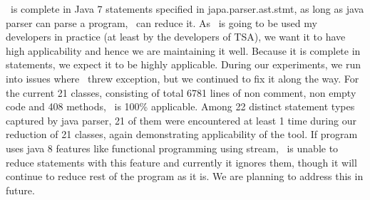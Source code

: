 \mytool\ is complete in Java 7 statements specified in japa.parser.ast.stmt, as long as java parser can parse a program, \mytool\ can reduce it. As \mytool\ is going to be used my developers in practice (at least by the developers of TSA), we want it to have high applicability and hence we are maintaining it well. Because it is complete in statements, we expect it to be highly applicable. During our experiments, we run into issues where \mytool\ threw exception, but we continued to fix it along the way. For the current 21 classes, consisting of total 6781 lines of non comment, non empty code and 408 methods, \mytool\ is 100\% applicable. Among 22 distinct statement types captured by java parser, 21 of them were encountered at least 1 time during our reduction of 21 classes, again demonstrating applicability of the tool. If program uses java 8  features like functional programming using stream, \mytool\ is unable to reduce statements with this feature and currently it ignores them, though it will continue to reduce rest of the program as it is. We are planning to address this in future. 